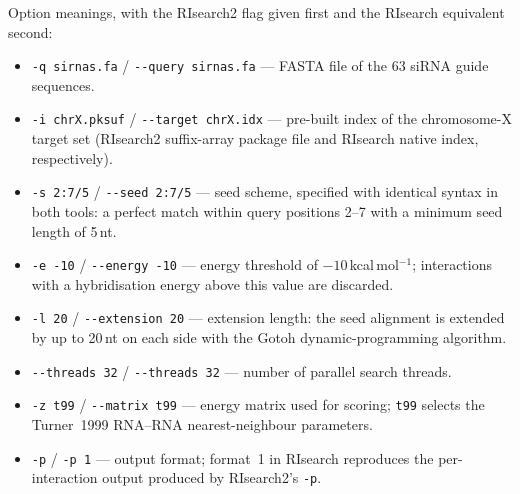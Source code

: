 \documentclass[11pt]{article}
\begin{document}
\noindent Option meanings, with the RIsearch2 flag given first and the RIsearch equivalent second:
\begin{itemize}
  \item \texttt{-q sirnas.fa} / \texttt{-{}-query sirnas.fa} — FASTA file
    of the 63 siRNA guide sequences.
  \item \texttt{-i chrX.pksuf} / \texttt{-{}-target chrX.idx} — pre-built
    index of the chromosome-X target set (RIsearch2 suffix-array package
    file and RIsearch native index, respectively).
  \item \texttt{-s 2:7/5} / \texttt{-{}-seed 2:7/5} — seed scheme,
    specified with identical syntax in both tools: a perfect match within
    query positions 2--7 with a minimum seed length of 5\,nt.
  \item \texttt{-e -10} / \texttt{-{}-energy -10} — energy threshold of
    $-10$\,kcal\,mol$^{-1}$; interactions with a hybridisation energy
    above this value are discarded.
  \item \texttt{-l 20} / \texttt{-{}-extension 20} — extension length:
    the seed alignment is extended by up to 20\,nt on each side with the
    Gotoh dynamic-programming algorithm.
  \item \texttt{-{}-threads 32} / \texttt{-{}-threads 32} — number of
    parallel search threads.
  \item \texttt{-z t99} / \texttt{-{}-matrix t99} — energy matrix used
    for scoring; \texttt{t99} selects the Turner~1999 RNA--RNA
    nearest-neighbour parameters.
  \item \texttt{-p} / \texttt{-p 1} — output format; format~1 in RIsearch
    reproduces the per-interaction output produced by RIsearch2's
    \texttt{-p}.
\end{itemize}
\end{document}
